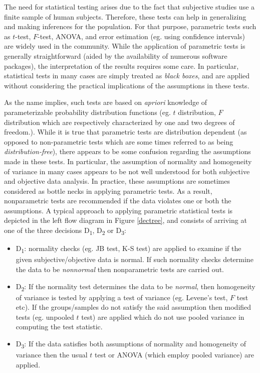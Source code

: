 \documentclass[10pt,final,Twcolumn]{IEEEtran}
\begin{document}
The need for statistical testing arises due to the fact that subjective studies use a finite sample of human subjects. Therefore, these tests can help in generalizing and making inferences for the population. For that purpose, parametric tests such as $t$-test, $F$-test, ANOVA, and error estimation (eg. using confidence intervals) are widely used in the community. While the application of parametric tests is generally straightforward (aided by the availability of numerous software packages), the interpretation of the results requires some care. In particular, statistical tests in many cases are simply treated as {\it {black boxes}}, and are applied without considering the practical implications of the assumptions in these tests. 

As the name implies, such tests are based on {\it{apriori}} knowledge of parameterizable probability distribution functions (eg. $t$ distribution, $F$ distribution which are respectively characterized by one and two degrees of freedom.). While it is true that parametric tests are distribution dependent (as opposed to non-parametric tests which are some times referred to as being {\it{distribution-free}}), there appears to be some confusion regarding the assumptions made in these tests. In particular, the assumption of normality and homogeneity of variance  in many cases appears to be not well understood for both subjective and objective data analysis. In practice, these assumptions are sometimes considered as bottle necks in applying parametric tests. As a result, nonparametric tests are recommended if the data violates one or both the assumptions. A typical approach to applying parametric statistical tests is depicted in the left flow diagram in Figure \ref{dectree}, and consists of arriving at one of the three decisions D\textsubscript{1}, D\textsubscript{2} or D\textsubscript{3}:
\begin{itemize}
\item D\textsubscript{1}: normality checks (eg. JB test, K-S test) are applied to examine if the given subjective/objective data is normal. If such normality checks determine the data to be {\it{nonnormal}} then nonparametric tests are carried out.

\item D\textsubscript{2}: If the normality test determines the data to be {\it{normal}}, then homogeneity of variance is tested by applying a test of variance (eg. Levene's test, $F$ test etc). If the groups/samples do not satisfy the said assumption then modified tests (eg. unpooled $t$ test) are applied which do not use pooled variance in computing the test statistic.

\item D\textsubscript{3}:  If the data satisfies both assumptions of normality and homogeneity of variance then the usual $t$ test or ANOVA (which employ pooled variance) are applied.

\end{itemize}
\end{document}

